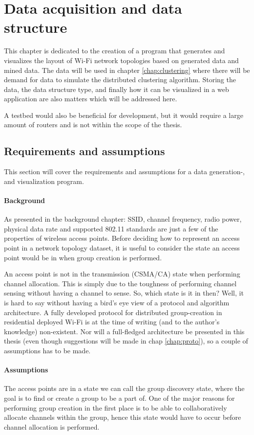 \chapter{Data acquisition and data structure}\label{dataacc}
This chapter is dedicated to the creation of a program that generates and visualizes the layout of Wi-Fi network topologies based on generated data and mined data.
The data will be used in chapter \ref{chap:clustering} where there will be demand for data to simulate the distributed clustering algorithm. Storing the data,
the data structure type, and finally how it can be visualized in a web application are also matters which will be addressed here. 

A testbed would also be beneficial for development, but it would require a large amount of routers and is not within the scope of the thesis. 

\section{Requirements and assumptions}
This section will cover the requirements and assumptions for a data generation-, and visualization program. 

\subsubsection{Background}
As presented in the background chapter: SSID, channel frequency, radio power, physical data rate and supported 802.11 standards are just a few of the properties
of wireless access points. Before deciding how to represent an access point in a network topology dataset, it is useful to
consider the state an access point would be in when group creation is performed.  

An access point is not in the transmission (CSMA/CA) state when performing channel allocation. This is simply due to the toughness of performing channel sensing without
having a channel to sense. So, which state is it in then? Well, it is hard to say without having a bird's eye view of a protocol and algorithm architecture. A fully developed protocol
for distributed group-creation in residential deployed Wi-Fi is at the time of writing (and to the author's knowledge) non-existent. Nor will a full-fledged architecture be presented in
this thesis (even though suggestions will be made in chap \ref{chap:proto}), so a couple of assumptions has to be made. 

\subsubsection{Assumptions}
The access points are in a state we can call the group discovery state, where the goal is to find or create a group to be a part of.
One of the major reasons for performing group creation in the first place is to be able to collaboratively allocate channels within the group, hence this state would
have to occur before channel allocation is performed. 

